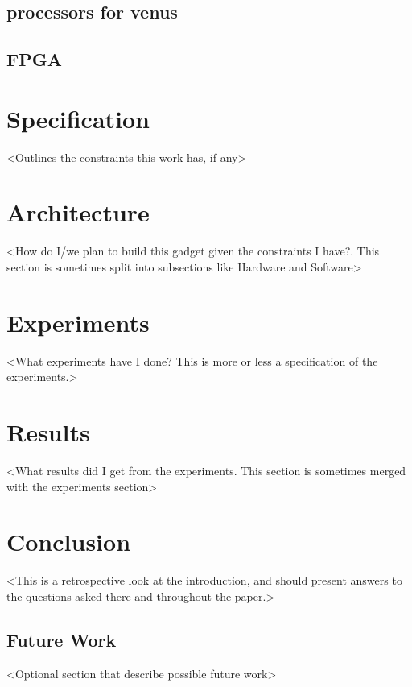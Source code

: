 \documentclass[10pt,twocolumn]{article}
\begin{document}
\subsection{processors for venus}

\subsection{FPGA}

\section{Specification}
<Outlines the constraints this work has, if any>\\

\section{Architecture}
<How do I/we plan to build this gadget given the constraints I have?. This section is sometimes split into subsections like Hardware and Software>

\section{Experiments}
<What experiments have I done? This is more or less a specification of the experiments.>

\section{Results}
<What results did I get from the experiments. This section is sometimes merged with the experiments section>

\section{Conclusion}
<This is a retrospective look at the introduction, and should present answers to the questions asked there and throughout the paper.>

\subsection{Future Work}
<Optional section that describe possible future work>
\end{document}
